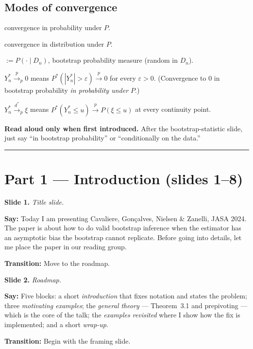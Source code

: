 \documentclass[11pt]{article}
\theoremstyle{definition}
\newcommand{\Pstar}{P^{*}}
\newcommand{\dto}{\xrightarrow{d}}
\newcommand{\pto}{\xrightarrow{p}}
\newcommand{\dstarto}{\xrightarrow{d^{*}}}
\newcommand{\Dn}{D_{n}}
\newcommand{\slide}[2]{%
  \medskip
  \noindent\colorbox{soft}{\parbox{\linewidth}{\textbf{Slide #1.} \textit{#2}}}
  \medskip
}
\newcommand{\say}[1]{\textbf{Say:} #1}
\newcommand{\trans}[1]{\textbf{Transition:} #1}
\begin{document}
\subsection*{Modes of convergence}
\begin{description}[leftmargin=2.6cm,style=nextline]
  \item[$\pto$] convergence in probability under $P$.
  \item[$\dto$] convergence in distribution under $P$.
  \item[$\Pstar$] $\!:=P(\cdot\mid\Dn)$, bootstrap probability measure (random in $\Dn$).
  \item[$\pto_p$ \,(written $\xrightarrow{p^{*}}_{p}$)] $Y_n^*\pto_p 0$ means
    $\Pstar(|Y_n^*|>\varepsilon)\pto 0$ for every $\varepsilon>0$. (Convergence to $0$
    in bootstrap probability \emph{in probability under $P$}.)
  \item[$\dstarto_p$] $Y_n^*\dstarto_p\xi$ means
    $\Pstar(Y_n^*\le u)\pto P(\xi\le u)$ at every continuity point.
\end{description}

\textbf{Read aloud only when first introduced.} After the bootstrap-statistic slide,
just say ``in bootstrap probability'' or ``conditionally on the data.''

\bigskip
\hrule
\bigskip

\section{Part 1 --- Introduction (slides 1--8)}

\slide{1}{Title slide.}
\say{Today I am presenting Cavaliere, Gonçalves, Nielsen \& Zanelli, JASA 2024.
The paper is about how to do valid bootstrap inference when the estimator has an
asymptotic bias the bootstrap cannot replicate. Before going into details, let
me place the paper in our reading group.}

\trans{Move to the roadmap.}

\slide{2}{Roadmap.}
\say{Five blocks: a short \emph{introduction} that fixes notation and states the
problem; three \emph{motivating examples}; the \emph{general theory} ---
Theorem~3.1 and prepivoting --- which is the core of the talk; the
\emph{examples revisited} where I show how the fix is implemented; and a
short \emph{wrap-up}.}

\trans{Begin with the framing slide.}
\end{document}
